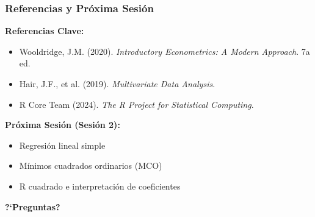 \documentclass[aspectratio=169,11pt]{beamer}
\newcommand{\highlight}[1]{\textcolor{uddlight}{\bfseries #1}}
\begin{document}
\begin{frame}
  \frametitle{Referencias y Pr\'oxima Sesi\'on}
  \small
  \textbf{Referencias Clave:}
  \begin{itemize}
    \setlength{\itemsep}{2pt}
    \item Wooldridge, J.M. (2020). \textit{Introductory Econometrics: A Modern Approach}. 7a ed.
    \item Hair, J.F., et al. (2019). \textit{Multivariate Data Analysis}.
    \item R Core Team (2024). \textit{The R Project for Statistical Computing}.
  \end{itemize}

  \vspace{0.4cm}
  \textbf{Pr\'oxima Sesi\'on (Sesi\'on 2):}
  \begin{itemize}
    \setlength{\itemsep}{2pt}
    \item Regresi\'on lineal simple
    \item M\'inimos cuadrados ordinarios (MCO)
    \item R cuadrado e interpretaci\'on de coeficientes
  \end{itemize}

  \vspace{0.4cm}
  \centering
  \Large \highlight{?`Preguntas?}
\end{frame}
\end{document}
